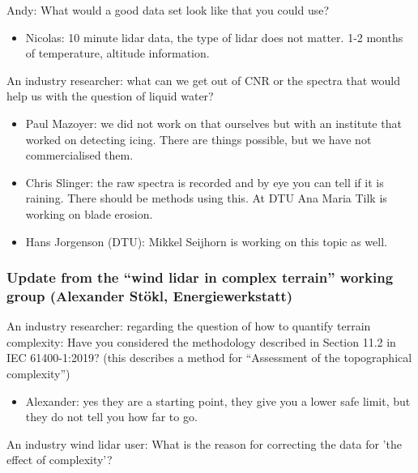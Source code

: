 Andy: What would a good data set look like that you could use?

\begin{itemize}
\item Nicolas: 10 minute lidar data, the type of lidar does not matter. 1-2 months of temperature, altitude information.
\end{itemize}

An industry researcher: what can we get out of CNR or the spectra that would help us with the question of liquid water?

\begin{itemize}
\item Paul Mazoyer: we did not work on that ourselves but with an institute   that worked on detecting icing. There are things possible, but we have not commercialised them.
\item Chris Slinger: the raw spectra is recorded and by eye you can tell if it is raining. There should be methods using this. At DTU Ana Maria Tilk is working on blade erosion.
\item Hans Jorgenson (DTU): Mikkel Seijhorn is working on this topic as well.
\end{itemize}

\subsubsection[Update from the \enquote{wind lidar in complex terrain} working group]{Update from the \enquote{wind lidar in complex terrain} working group (Alexander Stökl, Energiewerkstatt)}
\label{sec:news-complex-terrain-group}

An industry researcher: regarding the question of how to quantify terrain complexity: Have you considered the methodology described in Section 11.2 in IEC 61400-1:2019? (this describes a method for \enquote{Assessment of the topographical complexity})

\begin{itemize}
\item Alexander: yes they are a starting point, they give you a lower safe limit, but they do not tell you how far to go.
\end{itemize}

An industry wind lidar user: What is the reason for correcting the data for 'the effect of complexity'?

